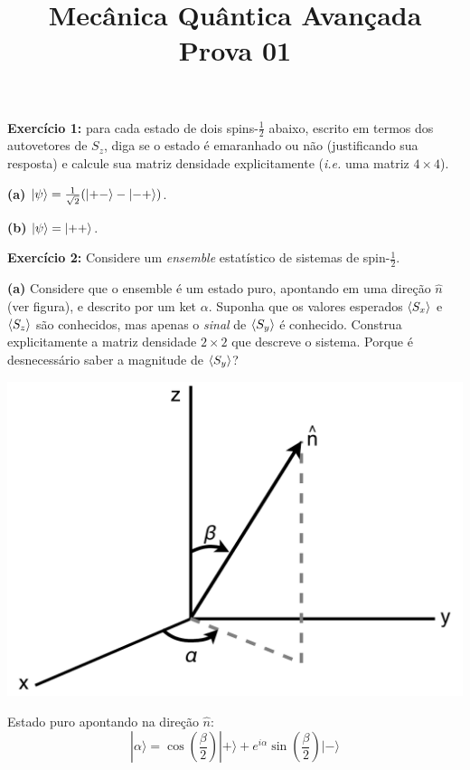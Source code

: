\documentclass[12pt]{article}
\title{Mecânica Quântica Avançada\\Prova 01}
\date{}
\begin{document}
\maketitle
\vspace*{-3em}

\textbf{Exercício 1:} para cada estado de dois spins-$\frac{1}{2}$ abaixo, escrito em termos dos autovetores de $S_z$, diga se o estado é emaranhado ou não (justificando sua resposta) e calcule sua matriz densidade explicitamente (\textit{i.e.} uma matriz $4\times4$).

\textbf{(a)} $\ket{\psi} = \frac{1}{\sqrt{2}}(\ket{+-}-\ket{-+})$.

\textbf{(b)} $\ket{\psi} = \ket{++}$.

\vspace*{1em}

\textbf{Exercício 2:} Considere um \emph{ensemble} estatístico de sistemas de spin-$\frac{1}{2}$.

\textbf{(a)} Considere que o ensemble é um estado puro, apontando em uma direção $\hat{n}$ (ver figura), e descrito por um ket $\alpha$. Suponha que os valores esperados $\ev{S_x}$ e $\ev{S_z}$ são conhecidos, mas apenas o \emph{sinal} de $\ev{S_y}$ é conhecido. Construa explicitamente a matriz densidade $2\times2$ que descreve o sistema. Porque é desnecessário saber a magnitude de $\ev{S_y}$?

\medskip

\begin{minipage}{0.4\textwidth}
\includegraphics[width=\textwidth]{Figures/nVersor.pdf}
\end{minipage}%
\begin{minipage}{0.6\textwidth}
Estado puro apontando na direção $\hat{n}$:
\[
|\alpha\rangle=\cos \left(\frac{\beta}{2}\right)|+\rangle+e^{i \alpha} \sin \left(\frac{\beta}{2}\right)|-\rangle
\]
\end{minipage}
\end{document}
